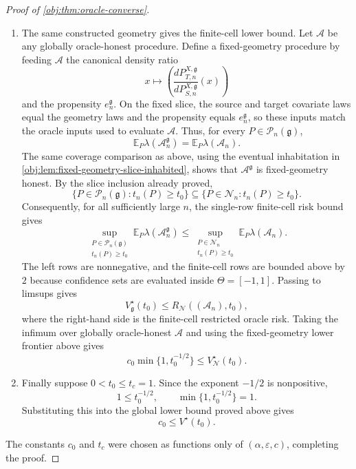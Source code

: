 \documentclass[11pt]{article}
\begin{document}
\begin{proof}[Proof of \cref{obj:thm:oracle-converse}]
\begin{enumerate}
\item The same constructed geometry gives the finite-cell lower bound. Let \(\mathcal A\) be
any globally oracle-honest procedure. Define a fixed-geometry procedure by feeding
\(\mathcal A\) the canonical density ratio
\[
  x\mapsto
  \left(\frac{dP^{X,\mathfrak g}_{T,n}}{dP^{X,\mathfrak g}_{S,n}}(x)\right)
\]
and the propensity \(e^{\mathfrak g}_n\). On the fixed slice, the source and target covariate
laws equal the geometry laws and the propensity equals \(e^{\mathfrak g}_n\), so these inputs
match the oracle inputs used to evaluate \(\mathcal A\). Thus, for every
\(P\in\mathcal P_n(\mathfrak g)\),
\[
  \mathbb E_P\lambda(\mathcal A^{\mathfrak g}_n)
  =
  \mathbb E_P\lambda(\mathcal A_n).
\]
The same coverage comparison as above, using the eventual inhabitation in
\cref{obj:lem:fixed-geometry-slice-inhabited}, shows that \(\mathcal A^{\mathfrak g}\) is
fixed-geometry honest. By the slice inclusion already proved,
\[
  \{P\in\mathcal P_n(\mathfrak g):t_n(P)\ge t_0\}
  \subseteq
  \{P\in\mathcal N_n:t_n(P)\ge t_0\}.
\]
Consequently, for all sufficiently large \(n\), the single-row finite-cell risk bound gives
\[
  \sup_{\substack{P\in\mathcal P_n(\mathfrak g)\\ t_n(P)\ge t_0}}
  \mathbb E_P\lambda(\mathcal A^{\mathfrak g}_n)
  \le
  \sup_{\substack{P\in\mathcal N_n\\ t_n(P)\ge t_0}}
  \mathbb E_P\lambda(\mathcal A_n).
\]
The left rows are nonnegative, and the finite-cell rows are bounded above by \(2\) because
confidence sets are evaluated inside \(\Theta=[-1,1]\). Passing to limsups gives
\[
  V_{\mathfrak g}^\star(t_0)
  \le
  R_{\mathcal N}((\mathcal A_n),t_0),
\]
where the right-hand side is the finite-cell restricted oracle risk. Taking the infimum over
globally oracle-honest \(\mathcal A\) and using the fixed-geometry lower frontier above gives
\[
  c_0\min\{1,t_0^{-1/2}\}
  \le
  V_{\mathcal N}^\star(t_0).
\] %

\item Finally suppose \(0<t_0\le t_c=1\). Since the exponent \(-1/2\) is nonpositive,
\[
  1\le t_0^{-1/2},
  \qquad
  \min\{1,t_0^{-1/2}\}=1 .
\]
Substituting this into the global lower bound proved above gives
\[
  c_0\le V^\star(t_0).
\] %
\end{enumerate}
The constants \(c_0\) and \(t_c\) were chosen as functions only of
\((\alpha,\varepsilon,c)\), completing the proof. %
\end{proof}
\end{document}
